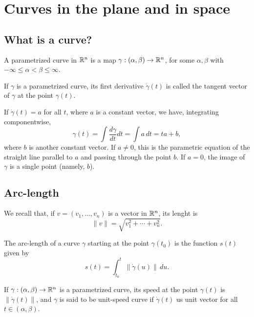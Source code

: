 \section{Curves in the plane and in space}

\subsection{What is a curve?}

\begin{defn}
  A parametrized curve in $\mathbb{R}^n$
  is a map $\gamma: (\alpha, \beta) \to \mathbb{R}^n$,
  for some $\alpha, \beta$ with $-\infty \leq \alpha < \beta \leq \infty$.
\end{defn}

\begin{defn}
  If $\gamma$ is a parametrized curve, its first derivative $\dot{\gamma}(t)$
  is called the tangent vector of $\gamma$ at the point $\gamma(t)$.
\end{defn}

\begin{proposition}
  If $\dot{\gamma}(t) = a$ for all $t$, where $a$ is a constant vector,
  we have, integrating componentwise,
  \[
    \gamma(t) = \int \frac{d\gamma}{dt} dt = \int a \, dt = ta + b,
  \]
  where $b$ is another constant vector.
  If $a \neq 0$, this is the parametric equation of the straight
  line parallel to $a$ and passing through the point $b$.
  If $a = 0$, the image of $\gamma$ is a single point (namely, $b$).
\end{proposition}

\subsection{Arc-length}

We recall that, if $v = (v_1, \dots, v_n)$ is a vector in $\mathbb{R}^n$, its lenght is
\[
    \|v\| = \sqrt{v_1^2 + \cdots + v_n^2}.
\]

\begin{defn}
  The arc-length of a curve $\gamma$ starting at the point $\gamma(t_0)$
  is the function $s(t)$ given by
  \[
    s(t) = \int_{t_0}^t \|\dot{\gamma}(u)\| \, du.
  \]
\end{defn}

\begin{defn}
  If $\gamma: (\alpha, \beta) \to \mathbb{R}^n$ is a parametrized curve,
  its speed at the point $\gamma(t)$ is $\|\dot{\gamma}(t)\|$,
  and $\gamma$ is said to be unit-speed curve if $\dot{\gamma}(t)$
  us unit vector for all $t \in (\alpha, \beta)$.
\end{defn}

